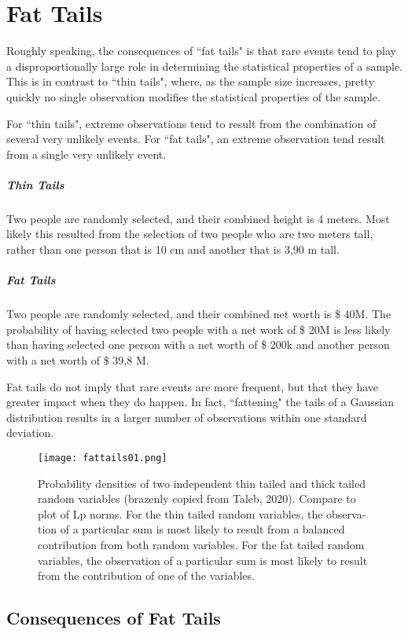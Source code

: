 \section{Fat Tails}
Roughly speaking, the consequences of ``fat tails" is that rare events tend to play a disproportionally large role in determining the statistical properties of a sample. This is in contrast to ``thin tails", where, as the sample size increases, pretty quickly no single observation modifies the statistical properties of the sample.

For ``thin tails", extreme observations tend to result from the combination of several very unlikely events. For ``fat tails", an extreme observation tend result from a single very unlikely event. 

\subparagraph{Thin Tails}
Two people are randomly selected, and their combined height is 4 meters. Most likely this resulted from the selection of two people who are two meters tall, rather than one person that is 10 cm and another that is 3,90 m tall. 

\subparagraph{Fat Tails}
Two people are randomly selected, and their combined net worth is \$ 40M. The probability of having selected two people with a net work of \$ 20M is less likely than having selected one person with a net worth of \$ 200k and another person with a net worth of \$ 39,8 M. 

Fat tails do not imply that rare events are more frequent, but that they have greater impact when they do happen. In fact, ``fattening" the tails of a Gaussian distribution results in a larger number of observations within one standard deviation. 

\begin{figure}
\centering
    \texttt{[image: fattails01.png]}
    \caption{Probability densities of two independent thin tailed and thick tailed random variables (brazenly copied from Taleb, 2020). Compare to plot of Lp norms. For the thin tailed random variables, the observa- tion of a particular sum is most likely to result from a balanced contribution from both random variables. For the fat tailed random variables, the observation of a particular sum is most likely to result from the contribution of one of the variables.}
    \label{fig:fattails01}
\end{figure}

\subsection{Consequences of Fat Tails}

